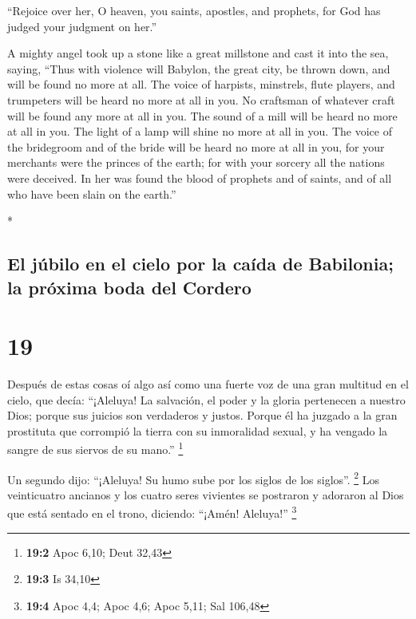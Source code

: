 \begin{paracol}{2}
\begin{otherlanguage}{english}
 ``Rejoice over her, O heaven, you saints, apostles, and
prophets, for God has judged your judgment on her.''

 A mighty angel took up a stone like a great millstone
and cast it into the sea, saying, ``Thus with violence will Babylon, the
great city, be thrown down, and will be found no more at all.
 The voice of harpists, minstrels, flute players, and
trumpeters will be heard no more at all in you. No craftsman of whatever
craft will be found any more at all in you. The sound of a mill will be
heard no more at all in you.  The light of a lamp will
shine no more at all in you. The voice of the bridegroom and of the
bride will be heard no more at all in you, for your merchants were the
princes of the earth; for with your sorcery all the nations were
deceived.  In her was found the blood of prophets and of
saints, and of all who have been slain on the earth.''

\end{otherlanguage}

\switchcolumn[0]*

\hypertarget{el-juxfabilo-en-el-cielo-por-la-cauxedda-de-babilonia-la-pruxf3xima-boda-del-cordero}{%
\subsection{El júbilo en el cielo por la caída de Babilonia; la próxima
boda del
Cordero}\label{el-juxfabilo-en-el-cielo-por-la-cauxedda-de-babilonia-la-pruxf3xima-boda-del-cordero}}

\hypertarget{section-36}{%
\section{19}\label{section-36}}

 Después de estas cosas oí algo así como una fuerte voz de
una gran multitud en el cielo, que decía: ``¡Aleluya! La salvación, el
poder y la gloria pertenecen a nuestro Dios;  porque sus
juicios son verdaderos y justos. Porque él ha juzgado a la gran
prostituta que corrompió la tierra con su inmoralidad sexual, y ha
vengado la sangre de sus siervos de su mano.'' \footnote{\textbf{19:2}
  Apoc 6,10; Deut 32,43}

 Un segundo dijo: ``¡Aleluya! Su humo sube por los siglos
de los siglos''. \footnote{\textbf{19:3} Is 34,10}  Los
veinticuatro ancianos y los cuatro seres vivientes se postraron y
adoraron al Dios que está sentado en el trono, diciendo: ``¡Amén!
Aleluya!'' \footnote{\textbf{19:4} Apoc 4,4; Apoc 4,6; Apoc 5,11; Sal
  106,48}


\end{paracol}
